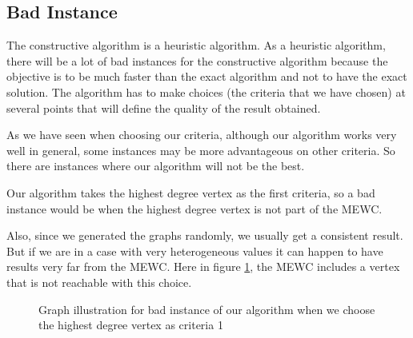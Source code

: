 
\subsection{Bad Instance}

The constructive algorithm is a heuristic algorithm. As a heuristic algorithm, there will be a
lot of bad instances for the constructive algorithm because the objective is to be much faster
than the exact algorithm and not to have the exact solution. The algorithm has to make
choices (the criteria that we have chosen) at several points that will define the quality of the result obtained. \bigskip

As we have seen when choosing our criteria, although our algorithm works very well in general, some instances may be more advantageous on other criteria. So there are instances where our algorithm will not be the best. 
\bigskip

Our algorithm takes the highest degree vertex as the first criteria, so a bad instance would be when the highest degree vertex is not part of the MEWC. 
\bigskip

Also, since we generated the graphs randomly, we usually get a consistent result. But if we are in a case with very heterogeneous values it can happen to have results very far from the MEWC. Here in figure \ref{fig:bad-instance-vertex-highest-degree1}, the MEWC includes a vertex that is not reachable with this choice.

\begin{center}
    \begin{figure}[H]
        \centering
        \caption{Graph illustration for bad instance of our algorithm when we choose the highest degree vertex as criteria 1}
        \label{fig:bad-instance-vertex-highest-degree1}
    \end{figure}
\end{center}

